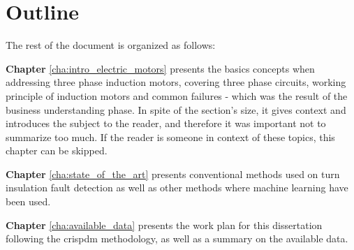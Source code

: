 \section{Outline} %
\label{sec:outline}

The rest of the document is organized as follows:

\textbf{Chapter} \ref{cha:intro_electric_motors} presents the basics concepts when addressing three phase induction motors, covering three phase circuits, working principle of induction motors and common failures - which was the result of the business understanding phase. In spite of the section's size, it gives context and introduces the subject to the reader, and therefore it was important not to summarize too much. If the reader is someone in context of these topics, this chapter can be skipped.

\textbf{Chapter} \ref{cha:state_of_the_art} presents conventional methods used on turn insulation fault detection as well as other methods where machine learning have been used.

\textbf{Chapter} \ref{cha:available_data} presents the work plan for this dissertation following the \acrshort{crispdm} methodology, as well as a summary on the available data.
